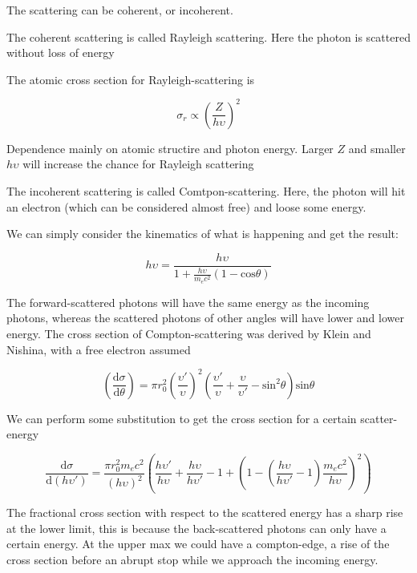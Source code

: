 The scattering can be coherent, or incoherent. 

The coherent scattering is called Rayleigh scattering. Here the photon is scattered without loss of energy

The atomic cross section for Rayleigh-scattering is 

\begin{equation}
    \sigma_r \propto \left( \frac{Z}{h\upsilon} \right)^2
\end{equation}

Dependence mainly on atomic structire and photon energy. 
Larger $Z$ and smaller $h\upsilon$ will increase the chance for Rayleigh scattering

The incoherent scattering is called Comtpon-scattering.
Here, the photon will hit an electron (which can be considered almost free) and loose some energy.

We can simply consider the kinematics of what is happening and get the result:

\begin{equation}
    h\upsilon = \frac{h\upsilon}{1 + \frac{h\upsilon}{m_e c^2}(1 - \mathrm{cos} \theta)}
\end{equation}

The forward-scattered photons will have the same energy as the incoming photons, whereas the scattered photons of other angles will have lower and lower energy.
The cross section of Compton-scattering was derived by Klein and Nishina, with a free electron assumed

\begin{equation}
    \left( \frac{\mathrm{d}\sigma}{\mathrm{d}\theta} \right ) = \pi r_0^2 \left( \frac{\upsilon'}{\upsilon} \right)^2 \left( \frac{\upsilon'}{\upsilon} + \frac{\upsilon}{\upsilon'} - \mathrm{sin}^2\theta \right ) \mathrm{sin} \theta
\end{equation}

We can perform some substitution to get the cross section for a certain scatter-energy 

\begin{equation}
    \frac{\mathrm{d}\sigma}{\mathrm{d} ( h\upsilon')} = \frac{\pi r_0^2 m_e c^2}{(h \upsilon)^2} \left ( \frac{h\upsilon'}{h\upsilon} + \frac{h\upsilon}{h\upsilon'} -1 + \left ( 1  - \left( \frac{h\upsilon}{h\upsilon'} -1 \right ) \frac{m_e c^2}{h\upsilon} \right ) ^2 \right )
\end{equation}

The fractional cross section with respect to the scattered energy has a sharp rise at the lower limit, this is because the back-scattered photons can only have a certain energy.
At the upper max we could have a compton-edge, a rise of the cross section before an abrupt stop while we approach the incoming energy.

